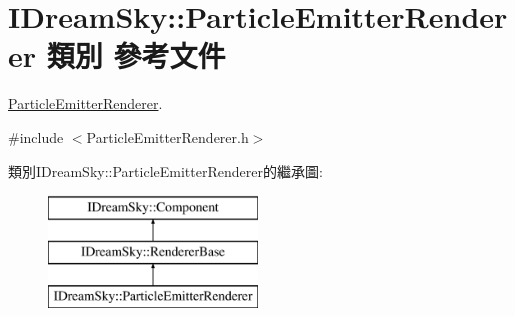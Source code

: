 \hypertarget{class_i_dream_sky_1_1_particle_emitter_renderer}{}\section{I\+Dream\+Sky\+:\+:Particle\+Emitter\+Renderer 類別 參考文件}
\label{class_i_dream_sky_1_1_particle_emitter_renderer}


\hyperlink{class_i_dream_sky_1_1_particle_emitter_renderer}{Particle\+Emitter\+Renderer}.  




{\ttfamily \#include $<$Particle\+Emitter\+Renderer.\+h$>$}

類別\+I\+Dream\+Sky\+:\+:Particle\+Emitter\+Renderer的繼承圖\+:\begin{figure}[H]
\begin{center}
\leavevmode
\includegraphics[height=3.000000cm]{class_i_dream_sky_1_1_particle_emitter_renderer}
\end{center}
\end{figure}
